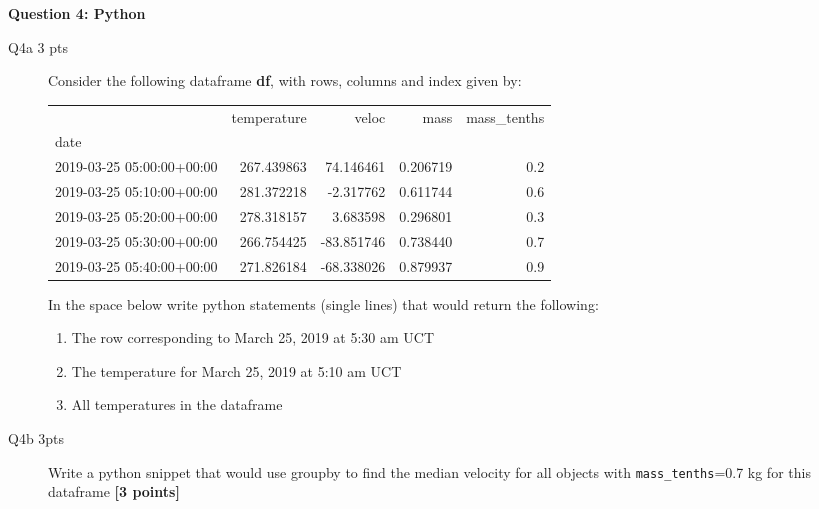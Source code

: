 \documentclass{article}
\begin{document}
\newpage
\textbf{Question 4: Python}
\begin{description}
\item[Q4a 3 pts] Consider the following dataframe \textbf{df}, with rows, columns and index given by:

\begin{tabular}{lrrrr}
\toprule
{} &  temperature &      veloc &      mass &  mass\_tenths \\
date                      &              &            &           &              \\
\midrule
2019-03-25 05:00:00+00:00 &   267.439863 &  74.146461 &  0.206719 &          0.2 \\
2019-03-25 05:10:00+00:00 &   281.372218 &  -2.317762 &  0.611744 &          0.6 \\
2019-03-25 05:20:00+00:00 &   278.318157 &   3.683598 &  0.296801 &          0.3 \\
2019-03-25 05:30:00+00:00 &   266.754425 & -83.851746 &  0.738440 &          0.7 \\
2019-03-25 05:40:00+00:00 &   271.826184 & -68.338026 &  0.879937 &          0.9 \\
\bottomrule
\end{tabular}

In the space below write python statements (single lines) that would
return the following:

\begin{enumerate}
\item The row corresponding to March 25, 2019 at 5:30 am UCT
\item The temperature for March 25, 2019 at 5:10 am UCT
\item All temperatures in the dataframe
\end{enumerate}

\vspace{5cm}

\item[Q4b 3pts] Write a python snippet that would use groupby to find
  the median velocity for all objects with \verb+mass_tenths+=0.7 kg for this
  dataframe \textbf{[3 points]}
  
\end{description}
\end{document}
